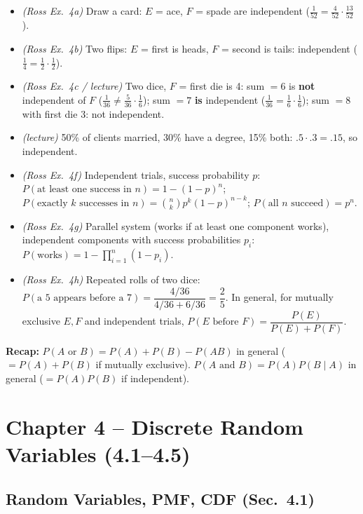 \documentclass[11pt]{article}
\let\oldsubsection\subsection
\renewcommand{\subsection}{\Needspace{14\baselineskip}\oldsubsection}
\newcommand{\nCr}[2]{\binom{#1}{#2}}
\begin{document}
\begin{exbox}[Examples]
\begin{itemize}
\item \emph{(Ross Ex.\ 4a)} Draw a card: $E$ = ace, $F$ = spade are independent ($\frac1{52}=\frac4{52}\cdot\frac{13}{52}$).
\item \emph{(Ross Ex.\ 4b)} Two flips: $E$ = first is heads, $F$ = second is tails: independent ($\frac14=\frac12\cdot\frac12$).
\item \emph{(Ross Ex.\ 4c / lecture)} Two dice, $F$ = first die is 4: sum $=6$ is \textbf{not} independent of $F$ ($\frac1{36}\ne\frac5{36}\cdot\frac16$); sum $=7$ \textbf{is} independent ($\frac1{36}=\frac16\cdot\frac16$); sum $=8$ with first die 3: not independent.
\item \emph{(lecture)} 50\% of clients married, 30\% have a degree, 15\% both: $.5\cdot.3=.15$, so independent.
\item \emph{(Ross Ex.\ 4f)} Independent trials, success probability $p$: $P(\text{at least one success in }n)=1-(1-p)^n$; $P(\text{exactly }k\text{ successes in }n)=\nCr nk p^k(1-p)^{n-k}$; $P(\text{all }n\text{ succeed})=p^n$.
\item \emph{(Ross Ex.\ 4g)} Parallel system (works if at least one component works), independent components with success probabilities $p_i$: $P(\text{works})=1-\prod_{i=1}^n(1-p_i)$.
\item \emph{(Ross Ex.\ 4h)} Repeated rolls of two dice: $P(\text{a 5 appears before a 7})=\dfrac{4/36}{4/36+6/36}=\dfrac25$. In general, for mutually exclusive $E,F$ and independent trials, $P(E\text{ before }F)=\dfrac{P(E)}{P(E)+P(F)}$.
\end{itemize}
\end{exbox}

\textbf{Recap:} $P(A\text{ or }B)=P(A)+P(B)-P(AB)$ in general ($=P(A)+P(B)$ if mutually exclusive). $P(A\text{ and }B)=P(A)P(B\mid A)$ in general ($=P(A)P(B)$ if independent).

\section{Chapter 4 -- Discrete Random Variables (4.1--4.5)}

\subsection{Random Variables, PMF, CDF (Sec.\ 4.1)}
\end{document}
